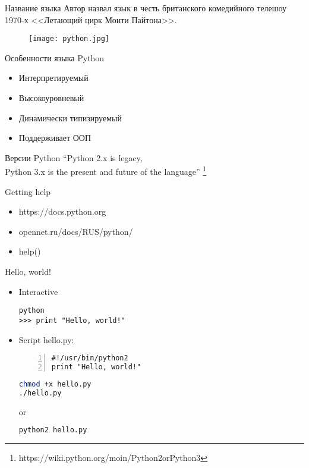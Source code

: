 \documentclass[hyperref={pdftex,unicode}]{beamer}
\begin{document}
\begin{frame}{Название языка}
  Автор назвал язык в честь британского комедийного телешоу 1970-х
  <<Летающий цирк Монти Пайтона>>.

  \begin{figure}[H]
    \texttt{[image: python.jpg]}
  \end{figure}
\end{frame}

\begin{frame}{Особенности языка Python}
  \begin{itemize}
    \item Интерпретируемый
    \item Высокоуровневый
    \item Динамически типизируемый
    \item Поддерживает ООП
  \end{itemize}
\end{frame}

\begin{frame}{Версии Python}
  \centering
  ``Python 2.x is legacy, \\
  Python 3.x is the present
  and future of the language'' \footnote[frame]{
    https://wiki.python.org/moin/Python2orPython3}
\end{frame}

\begin{frame}{Getting help}
  \begin{itemize}
    \item https://docs.python.org
    \item opennet.ru/docs/RUS/python/
    \item help()
  \end{itemize}
\end{frame}

\begin{frame}[fragile]{Hello, world!}
  \begin{itemize}
  \item Interactive
    \begin{lstlisting}
python
>>> print "Hello, world!"
    \end{lstlisting}
  \item Script hello.py:
    \begin{lstlisting}[numbers=left]
#!/usr/bin/python2
print "Hello, world!"
    \end{lstlisting}

  \begin{minipage}{0.4\linewidth}
     \begin{lstlisting}[language=bash]
chmod +x hello.py
./hello.py
     \end{lstlisting}
   \end{minipage}
   \hfill or \hfill
   \begin{minipage}{0.4\linewidth}
     \begin{lstlisting}[language=bash]
python2 hello.py
     \end{lstlisting}
   \end{minipage}

  \end{itemize}
\end{frame}
\end{document}
